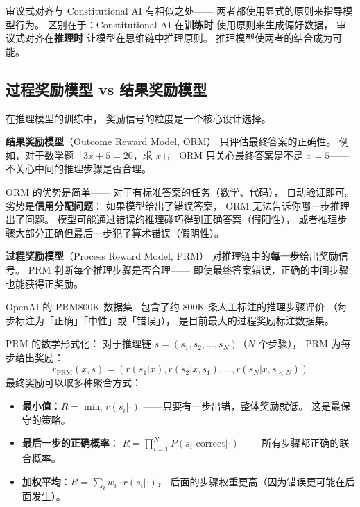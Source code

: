 审议式对齐与 Constitutional AI 有相似之处——
两者都使用显式的原则来指导模型行为。
区别在于：Constitutional AI 在\textbf{训练时}
使用原则来生成偏好数据，
审议式对齐在\textbf{推理时}
让模型在思维链中推理原则。
推理模型使两者的结合成为可能。

\subsection{过程奖励模型 vs 结果奖励模型}

在推理模型的训练中，
奖励信号的粒度是一个核心设计选择。

\textbf{结果奖励模型}（Outcome Reward Model, ORM）
只评估最终答案的正确性。
例如，对于数学题「$3x + 5 = 20$，求 $x$」，
ORM 只关心最终答案是不是 $x = 5$——
不关心中间的推理步骤是否合理。

ORM 的优势是简单——
对于有标准答案的任务（数学、代码），
自动验证即可。
劣势是\textbf{信用分配问题}：
如果模型给出了错误答案，
ORM 无法告诉你哪一步推理出了问题。
模型可能通过错误的推理碰巧得到正确答案（假阳性），
或者推理步骤大部分正确但最后一步犯了算术错误（假阴性）。

\textbf{过程奖励模型}（Process Reward Model, PRM）
对推理链中的\textbf{每一步}给出奖励信号。
PRM 判断每个推理步骤是否合理——
即使最终答案错误，正确的中间步骤也能获得正奖励。


OpenAI 的 PRM800K 数据集~\cite{lightman2023prm}
包含了约 800K 条人工标注的推理步骤评价
（每步标注为「正确」「中性」或「错误」），
是目前最大的过程奖励标注数据集。

PRM 的数学形式化：
对于推理链 $s = (s_1, s_2, \ldots, s_N)$（$N$ 个步骤），
PRM 为每步给出奖励：
\begin{equation}
  r_{\text{PRM}}(x, s) = \left(r(s_1|x), r(s_2|x, s_1), \ldots,
  r(s_N|x, s_{<N})\right)
\end{equation}
最终奖励可以取多种聚合方式：
\begin{itemize}[noitemsep]
  \item \textbf{最小值}：$R = \min_i r(s_i | \cdot)$
       ——只要有一步出错，整体奖励就低。
        这是最保守的策略。
  \item \textbf{最后一步的正确概率}：
        $R = \prod_{i=1}^N P(s_i \text{ correct} | \cdot)$
       ——所有步骤都正确的联合概率。
  \item \textbf{加权平均}：$R = \sum_i w_i \cdot r(s_i | \cdot)$，
        后面的步骤权重更高（因为错误更可能在后面发生）。
\end{itemize}

